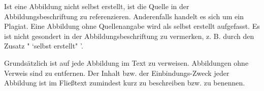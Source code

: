 Ist eine Abbildung nicht selbst erstellt, ist die Quelle in der Abbildungsbeschriftung zu referenzieren. Anderenfalls handelt es sich um ein Plagiat. Eine Abbildung ohne Quellenangabe wird als selbst erstellt aufgefasst. Es ist nicht gesondert in der Abbildungsbeschriftung zu vermerken, z. B. durch den Zusatz " `selbst erstellt" '. 

Grundsätzlich ist auf jede Abbildung im Text zu verweisen. Abbildungen ohne Verweis sind zu entfernen. Der Inhalt bzw. der Einbindungs-Zweck jeder Abbildung ist im Fließtext zumindest kurz zu beschreiben bzw. zu benennen. 